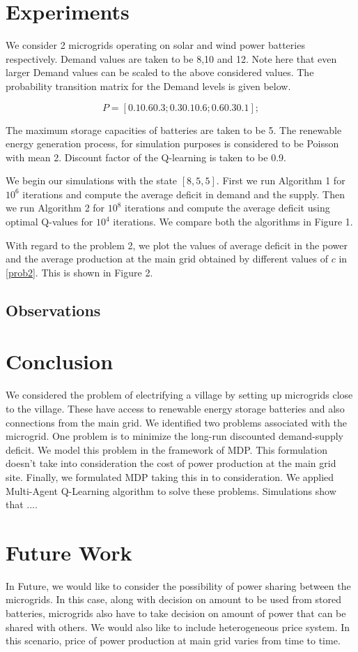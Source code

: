 \documentclass[conference]{IEEEtran}
\begin{document}
\section{Experiments}
We consider 2 microgrids operating on solar and wind power batteries respectively. Demand values are taken to be 8,10 and 12. Note here that even larger Demand values can be scaled to the above considered values. The probability transition matrix for the Demand levels is given below. 

$$ P = [0.1 0.6 0.3; 0.3 0.1 0.6; 0.6 0.3 0.1];$$

The maximum storage capacities of batteries are taken to be 5. The renewable energy generation process, for simulation purposes is considered to be Poisson with mean 2. Discount factor of the Q-learning is taken to be 0.9.

We begin our simulations with the state $[8,5,5]$. First we run Algorithm 1 for $10^6$ iterations and compute the average deficit in demand and the supply. Then we run Algorithm 2 for $10^8$ iterations and compute the average deficit using optimal Q-values for $10^4$ iterations. We compare both the algorithms in Figure 1.

With regard to the problem 2, we plot the values of average deficit in the power and the average production at the main grid obtained by different values of $c$ in \eqref{prob2}. This is shown in Figure 2. 

\subsection{Observations}


\section{Conclusion}
We considered the problem of electrifying a village by setting up microgrids close to the village. These have access to renewable energy storage batteries and also connections from the main grid. We identified two problems associated with the microgrid. One problem is to minimize the long-run discounted demand-supply deficit. We model this problem in the framework of MDP. This formulation doesn't take into consideration the cost of power production at the main grid site. Finally, we formulated MDP taking this in to consideration. We applied Multi-Agent Q-Learning algorithm to solve these problems. Simulations show that ....

\section{Future Work}
In Future, we would like to consider the possibility of power sharing between the microgrids. In this case, along with decision on amount to be used from stored batteries, microgrids also have to take decision on amount of power that can be shared with others. We would also like to include heterogeneous price system. In this scenario, price of power production at main grid varies from time to time.
\end{document}
